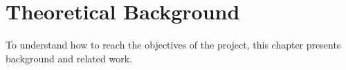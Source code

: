 %

\section{Theoretical Background}

To understand how to reach the objectives of the project, this chapter presents background and related work. 







